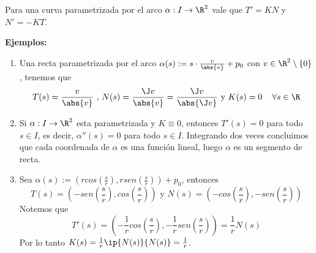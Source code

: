 \documentclass{article}
\begin{document}
\begin{prop}
    Para una curva parametrizada por el arco $\alpha: I\to\R^{2}$ vale que $T'=KN$ y $N'=-KT$.
\end{prop}

\noindent\textbf{Ejemplos:}
\begin{enumerate}
    \item Una recta parametrizada por el arco $\alpha(s):=s\cdot \frac{v}{\abs{v}}+p_{0}$ con
    $v\in\R^{2}\setminus\{0\}$, tenemos que
    \begin{equation*}
        T(s)=\frac{v}{\abs{v}}\text{ , }N(s)=\frac{\J v}{\abs{v}}=\frac{\J v}{\abs{\J v}}
        \text{ y }K(s)=0\hspace{4mm}\forall s\in\R
    \end{equation*}

    \item Si $\alpha: I\to\R^{2}$ esta parametrizada y $K\equiv0$, entonces $T'(s)=0$ para todo
    $s\in I$, es decir, $\alpha''(s)=0$ para todo $s\in I$. Integrando dos veces concluimos que
    cada coordenada de $\alpha$ es una función lineal, luego $\alpha$ es un segmento de recta.

    \item Sea 
    $\alpha(s):=\left(rcos\left(\frac{s}{r}\right),rsen\left(\frac{s}{r}\right)\right)+p_{0}$,
    entonces
    \begin{equation*}
        T(s)=\left(-sen\left(\frac{s}{r}\right),cos\left(\frac{s}{r}\right)\right)\text{ y }
        N(s)=\left(-cos\left(\frac{s}{r}\right),-sen\left(\frac{s}{r}\right)\right)
    \end{equation*}
    Notemos que
    \begin{equation*}
        T'(s)=\left(-\frac{1}{r}cos\left(\frac{s}{r}\right),-\frac{1}{r}sen\left(
        \frac{s}{r}\right)\right)=\frac{1}{r}N(s)
    \end{equation*}
    Por lo tanto $K(s)=\frac{1}{r}\ip{N(s)}{N(s)}=\frac{1}{r}$.
\end{enumerate}
\end{document}
